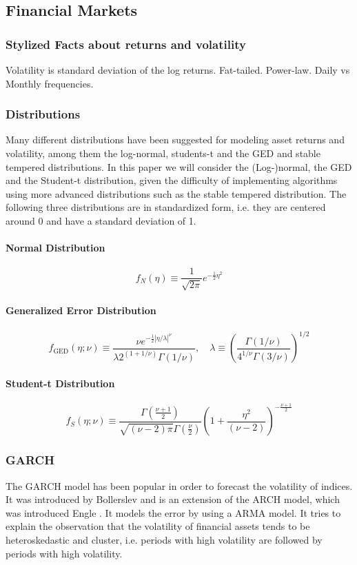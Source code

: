 \documentclass[11pt,a4paper]{article}
\begin{document}
\subsection{Financial Markets}

\subsubsection{Stylized Facts about returns and volatility}
Volatility is standard deviation of the log returns.
Fat-tailed. Power-law. Daily vs Monthly frequencies. 

\subsubsection{Distributions}
Many different distributions have been suggested for modeling asset returns and volatility, among them the log-normal, students-t and the \ac{GED} and stable tempered distributions. 
In this paper we will consider the (Log-)normal, the \ac{GED} and the Student-t distribution, given the difficulty of implementing algorithms using more advanced distributions such as the stable tempered distribution. The following three distributions are in standardized form, i.e. they are centered around 0 and have a standard deviation of 1.

\paragraph{Normal Distribution}
$$f_N(\eta) \equiv \frac{1}{\sqrt{2 \pi}} e^{-\frac{1}{2} \eta^2}$$

\paragraph{Generalized Error Distribution}
$$f_{\mathrm{GED}}(\eta ; \nu) \equiv \frac{\nu e^{-\frac{1}{2}|\eta / \lambda|^\nu}}{\lambda 2^{(1+1 / \nu)} \Gamma(1 / \nu)}, \quad \lambda \equiv\left(\frac{\Gamma(1 / \nu)}{4^{1 / \nu} \Gamma(3 / \nu)}\right)^{1 / 2}$$
\paragraph{Student-t Distribution}
$$f_S(\eta ; \nu) \equiv \frac{\Gamma\left(\frac{\nu+1}{2}\right)}{\sqrt{(\nu-2) \pi} \Gamma\left(\frac{\nu}{2}\right)}\left(1+\frac{\eta^2}{(\nu-2)}\right)^{-\frac{\nu+1}{2}}$$

\subsubsection{GARCH}
\label{sss:GARCH}
The \ac{GARCH} model has been popular in order to forecast the volatility of indices. It was introduced  by Bollerslev \cite{bollerslev_generalized_1986} and is an extension of the ARCH model, which was introduced Engle \cite{engle_autoregressive_1982}. It models the error by using a \ac{ARMA} model.
It tries to explain the observation that the volatility of financial assets tends to be heteroskedastic and cluster, i.e. periods with high volatility are followed by periods with high volatility.
\end{document}
